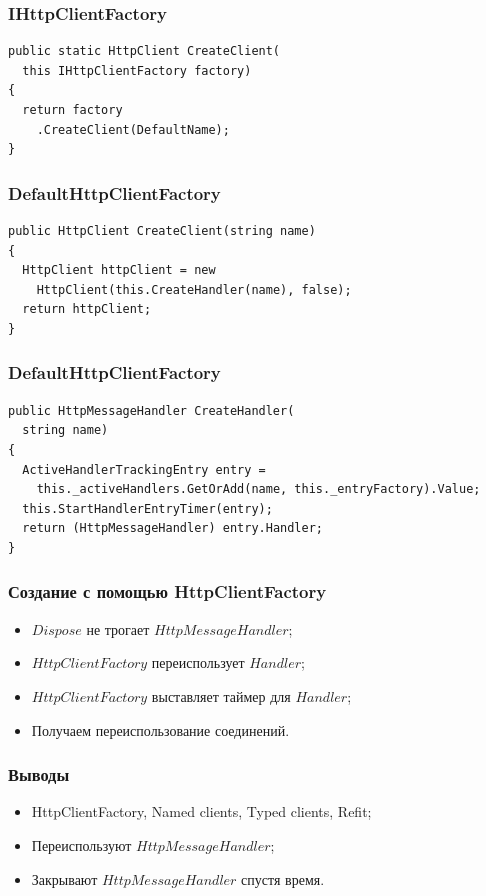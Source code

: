 \documentclass[17pt,aspectratio=169]{beamer}
\begin{document}
\begin{frame}[fragile]
\frametitle{IHttpClientFactory}
\begin{lstlisting}
public static HttpClient CreateClient(
  this IHttpClientFactory factory)
{
  return factory
    .CreateClient(DefaultName);
}
\end{lstlisting}
\end{frame}

\begin{frame}[fragile]
\frametitle{DefaultHttpClientFactory}
\begin{lstlisting}
public HttpClient CreateClient(string name)
{
  HttpClient httpClient = new 
    HttpClient(this.CreateHandler(name), false);
  return httpClient;
}
\end{lstlisting}
\end{frame}

\begin{frame}[fragile]
\frametitle{DefaultHttpClientFactory}
\begin{lstlisting}
public HttpMessageHandler CreateHandler(
  string name)
{
  ActiveHandlerTrackingEntry entry = 
    this._activeHandlers.GetOrAdd(name, this._entryFactory).Value;
  this.StartHandlerEntryTimer(entry);
  return (HttpMessageHandler) entry.Handler;
}
\end{lstlisting}
\end{frame}

\begin{frame}
\frametitle{Создание с помощью HttpClientFactory}
\begin{itemize}
	\item <1-> $Dispose$ не трогает $HttpMessageHandler$;
	\item <2-> $HttpClientFactory$ переиспользует $Handler$;
	\item <3-> $HttpClientFactory$ выставляет таймер для $Handler$;
	\item <4-> Получаем переиспользование соединений.
\end{itemize}
\end{frame}

\begin{frame}
\frametitle{Выводы}
\begin{itemize}
	\item <1-> HttpClientFactory, Named clients, Typed clients, Refit;
	\item <2-> Переиспользуют $HttpMessageHandler$;
	\item <3-> Закрывают $HttpMessageHandler$ спустя время.
\end{itemize}
\end{frame}
\end{document}
